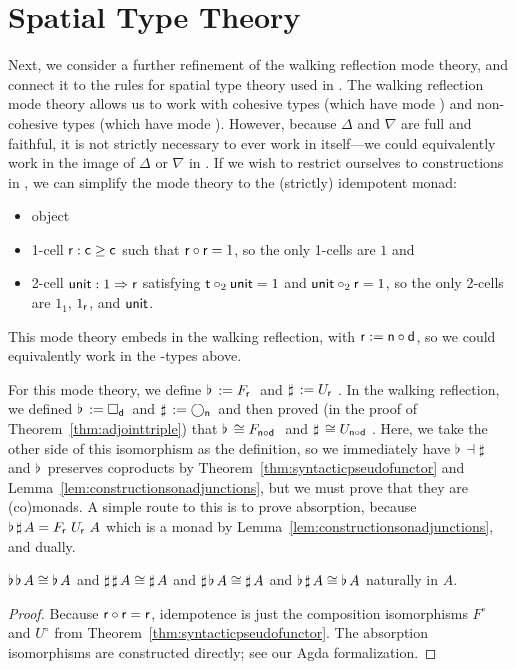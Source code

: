 \documentclass{drl-common/llncs}
\newcommand{\la}{\ensuremath{\dashv}}
\newcommand{\tc}[2]{\ensuremath{#1 \Rightarrow #2}}
\newcommand\compo[2]{\ensuremath{#1 \circ #2}}
\newcommand\comph[2]{\ensuremath{#1 \mathbin{\circ_2} #2}}
\newcommand\F[2]{\ensuremath{F_{#1} \,\, #2}}
\newcommand\U[2]{\ensuremath{U_{#1} \,\, #2}}
\newcommand\Bx[2]{\ensuremath{\Box_{#1} \, {#2}}}
\newcommand\Crc[2]{\ensuremath{\bigcirc_{#1} \, {#2}}}
\newcommand\Flat[1]{\ensuremath{\flat \, {#1}}}
\newcommand\Sharp[1]{\ensuremath{\sharp \, {#1}}}
\begin{document}
\section{Spatial Type Theory}
\label{sec:idempotent}

Next, we consider a further refinement of the walking reflection mode
theory, and connect it to the rules for spatial type theory used in
\citet{shulman15realcohesion}.  The walking reflection mode theory
allows us to work with cohesive types (which have mode ) and
non-cohesive types (which have mode ).  However, because $\Delta$
and $\nabla$ are full and faithful, it is not strictly necessary to ever
work in  itself---we could equivalently work in the image of
$\Delta$ or $\nabla$ in .  If we wish to restrict ourselves to
constructions in , we can simplify the mode theory to the
(strictly) idempotent monad:
\begin{itemize}
\item object 
\item 1-cell $\mathsf{r} : \mathsf{c} \ge \mathsf{c}$ such that
  $\compo{\dsd{r}}{\dsd{r}} = 1$, so the only 1-cells are $1$ and 
\item 2-cell $\dsd{unit} : \tc{1}{\dsd{r}}$ satisfying $\comph{\dsd
  t}{\dsd{unit}} = 1$ and $\comph{\dsd{unit}}{\dsd{r}} = 1$, so 
  the only 2-cells are $1_1$, $1_{\mathsf{r}}$, and  $\mathsf{unit}$. 
\end{itemize}
This mode theory embeds in the walking reflection, with $\dsd{r} :=
\compo{\dsd{n}}{\dsd{d}}$, so we could equivalently work in the
-types above.

For this mode theory, we define $\Flat{} := \F{\dsd{r}}{}$ and $\Sharp{}
:= \U{\dsd{r}}{}$.  In the walking reflection, we defined $\Flat{} :=
\Bx{\dsd{d}}{}$ and $\Sharp{} := \Crc{\dsd{n}}{}$ and then proved (in
the proof of Theorem~\ref{thm:adjointtriple}) that $\Flat{} \iso
\F{\compo{\dsd n}{\dsd d}}$ and $\Sharp{} \iso \U{\compo{\dsd n}{\dsd
    d}}$. Here, we take the other side of this isomorphism as the
definition, so we immediately have $\Flat{} \la \Sharp{}$ and $\Flat{}$
preserves coproducts by Theorem~\ref{thm:syntacticpseudofunctor} and
Lemma~\ref{lem:constructionsonadjunctions}, but we must prove that they
are (co)monads.  A simple route to this is to prove absorption, because
$\Flat{\Sharp{A}} = \F{\dsd{r}}{\U{\dsd{r}}{A}}$ which is a monad by
Lemma~\ref{lem:constructionsonadjunctions}, and dually.

\begin{theorem}
 $\Flat{\Flat A} \iso \Flat A$ and $\Sharp{\Sharp A} \iso \Sharp A$
and $\Sharp{\Flat A} \iso \Sharp{A}$ 
and $\Flat{\Sharp A} \iso \Flat{A}$ naturally in $A$.
\end{theorem}
\begin{proof}
Because $\compo{\dsd r}{\dsd r} = {\dsd r}$, idempotence is just the composition
isomorphisms $F^\circ$ and $U^\circ$ from
Theorem~\ref{thm:syntacticpseudofunctor}.  The absorption isomorphisms
are constructed directly; see our Agda formalization.
\end{proof}
\end{document}
